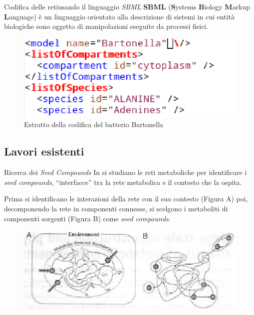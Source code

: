 \documentclass{beamer}
\begin{document}
\begin{frame}{Codifica delle reti}{usando il linguaggio \emph{SBML}}
  \textbf{SBML} (\textbf{S}ystems \textbf{B}iology \textbf{M}arkup
  \textbf{L}anguage) \`e un linguaggio orientato alla descrizione di
  sistemi in cui entit\`a biologiche sono oggetto di manipolazioni
  eseguite da processi fisici.
  \begin{figure}
    \includegraphics[scale=.6]{images/sbml-code-chunk.eps}
    \caption{Estratto della codifica del batterio Bartonella}
  \end{figure}
\end{frame}

\subsection{Lavori esistenti}

\begin{frame}{Ricerca dei \emph{Seed Compounds}}
  In \cite{Borenstein-Kupiec} si studiano le reti metaboliche per
  identificare i \emph{seed compounds}, ``interfacce'' tra la rete
  metabolica e il contesto che la ospita.

  Prima si identificano le interazioni della rete con il suo contesto
  (Figura A) poi, decomponendo la rete in componenti connesse, si
  scelgono i metaboliti di componenti sorgenti (Figura B) come
  \emph{seed compounds}.

  \begin{figure}
    \includegraphics[scale=.6]{images/biology-scc-decomposition.eps}
  \end{figure}

\end{frame}
\end{document}
